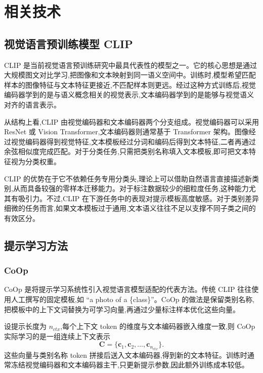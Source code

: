 \chapter{相关技术}

\section{视觉语言预训练模型 CLIP}

CLIP 是当前视觉语言预训练研究中最具代表性的模型之一\cite{clip2021}。它的核心思想是通过大规模图文对比学习,把图像和文本映射到同一语义空间中。训练时,模型希望匹配样本的图像特征与文本特征更接近,不匹配样本则更远。经过这种方式训练后,视觉编码器学到的是与语义概念相关的视觉表示,文本编码器学到的是能够与视觉语义对齐的语言表示。

从结构上看,CLIP 由视觉编码器和文本编码器两个分支组成。视觉编码器可以采用 ResNet 或 Vision Transformer,文本编码器则通常基于 Transformer 架构\cite{clip2021,chen2023vlp}。图像经过视觉编码器得到视觉特征,文本模板经过分词和编码后得到文本特征,二者再通过余弦相似度完成匹配。对于分类任务,只需把类别名称填入文本模板,即可把文本特征视为分类权重。

CLIP 的优势在于它不依赖任务专用分类头,理论上可以借助自然语言直接描述新类别,从而具备较强的零样本迁移能力\cite{clip2021}。对于标注数据较少的细粒度任务,这种能力尤其有吸引力。不过,CLIP 在下游任务中的表现对提示模板高度敏感。对于类别差异细微的任务而言,如果文本模板过于通用,文本语义往往不足以支撑不同子类之间的有效区分。

\section{提示学习方法}

\subsection{CoOp}

CoOp 是将提示学习系统性引入视觉语言模型适配的代表方法\cite{coop2022}。传统 CLIP 往往使用人工撰写的固定模板,如 ``a photo of a \{class\}''。CoOp 的做法是保留类别名称,把模板中的上下文词替换为可学习向量,再通过少量标注样本优化这些向量。

设提示长度为 \(n_{ctx}\),每个上下文 token 的维度与文本编码器嵌入维度一致,则 CoOp 实际学习的是一组连续上下文表示
\begin{equation}
\mathbf{C}=\{\mathbf{c}_1,\mathbf{c}_2,\ldots,\mathbf{c}_{n_{ctx}}\}.
\end{equation}
这些向量与类别名称 token 拼接后送入文本编码器,得到新的文本特征。训练时通常冻结视觉编码器和文本编码器主干,只更新提示参数,因此额外训练成本较低。

